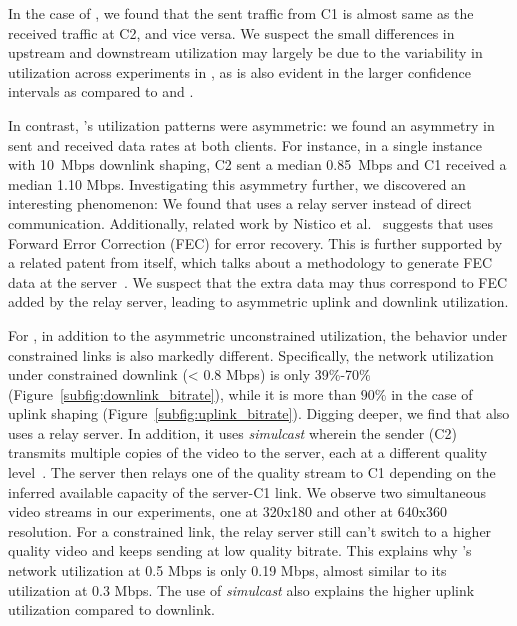 In the case of \teams, we found that the sent traffic from C1
is almost same as the received traffic at C2, and vice versa. 
We suspect the small
differences in upstream and downstream utilization may largely be due to the
variability in utilization across experiments in \teams, as is
also evident in the larger confidence intervals as compared to \zoom and \meet. 

In contrast, \zoom's utilization patterns were asymmetric: we found an
asymmetry in sent and received data rates at both clients. For instance, in a
single instance with 10~Mbps downlink shaping, C2 sent a median 0.85~Mbps and
C1 received a median 1.10 Mbps. Investigating this asymmetry further, we
discovered an interesting phenomenon: We found that \zoom uses a relay server
instead of direct communication. Additionally, related work by Nistico et
al.~\cite{nistico2020comparative} suggests that \zoom uses Forward Error
Correction (FEC) for error recovery. This is further supported by a related
patent from \zoom itself, which talks about a methodology to generate FEC data
at the server~\cite{liu2019error}. We suspect that the extra data may thus
correspond to FEC added by the relay server, leading to asymmetric uplink and
downlink utilization.  

For \meet, in addition to the asymmetric unconstrained utilization, the
behavior under constrained links is also markedly different. Specifically, the
network utilization under constrained downlink (< 0.8 Mbps) is only 39\%-70\%
(Figure~\ref{subfig:downlink_bitrate}), while it is more than $90\%$ in the
case of uplink shaping (Figure~\ref{subfig:uplink_bitrate}). Digging deeper,
we find that \meet also uses a relay server. In addition, it uses
\textit{simulcast} wherein the sender (C2) transmits multiple copies of the
video to the server, each at a different quality
level~\cite{nistico2020comparative}. The server then relays one of the quality
stream to C1 depending on the inferred available capacity of the server-C1
link. We observe two simultaneous video streams in our experiments, one at
320x180 and other at 640x360 resolution. For a constrained link, the relay
server still can't switch to a higher quality video and keeps sending at low
quality bitrate. This explains why \meet's network utilization at 0.5 Mbps is
only 0.19 Mbps, almost similar to its utilization at 0.3 Mbps.  The use of
\textit{simulcast} also explains the higher uplink utilization compared to
downlink. %



